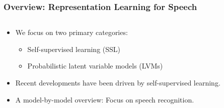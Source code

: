 \begin{frame}
    \frametitle{Overview: Representation Learning for Speech}

    \begin{columns}

        \begin{column}{0.4\textwidth}
            \begin{itemize}
                \item We focus on two primary categories:
                \begin{itemize}
                    \item Self-supervised learning (SSL)
                    \item Probabilistic latent variable models (LVMs)
                \end{itemize}
                \item Recent developments have been driven by self-supervised learning.
                \item A model-by-model overview: Focus on speech recognition.
            \end{itemize}
        \end{column}

        \begin{column}{0.6\textwidth}


\end{column}
\end{columns}
\end{frame}
